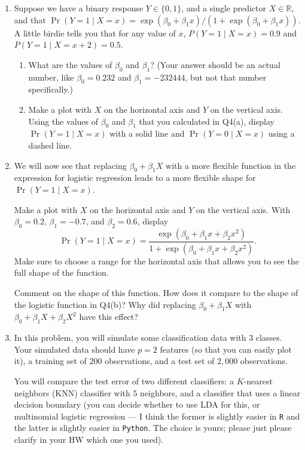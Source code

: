 \documentclass[12pt]{article}
\begin{document}
\begin{enumerate}
 
 \item Suppose we have a binary response $Y \in \{0,1\}$, and a single predictor $X \in \mathbb{R}$, and that  $\Pr(Y=1 \mid X=x) = {\exp(\beta_0 + \beta_1 x)}/{\left( 1+\exp(\beta_0 + \beta_1 x) \right)}$. A little birdie tells you that for any value of $x$, $P(Y=1 \mid X=x)=0.9$ and  $P(Y=1 \mid X=x+2)=0.5$.
 \begin{enumerate}
 \item What are the values of $\beta_0$ and $\beta_1$? (Your answer should be an actual number, like $\beta_0 = 0.232$ and $\beta_1=-232444$, but not that number specifically.)
 \item Make a plot  with $X$ on the horizontal axis and $Y$ on the vertical axis.  Using the values of $\beta_0$ and $\beta_1$ that you calculated in Q4(a), display $\Pr(Y=1 \mid X=x)$ with a solid line and $\Pr(Y=0 \mid X=x)$ using a dashed line.  %
 \end{enumerate}
 \item We will now see that replacing $\beta_0 + \beta_1 X$ with a more flexible function in the expression for logistic regression leads to a more flexible shape for $\Pr(Y=1 \mid X=x)$. 
 
 Make a plot with $X$ on the horizontal axis and $Y$ on the vertical axis. With $\beta_0=0.2$, $\beta_1=-0.7$, and $\beta_2=0.6$, display  $$\Pr(Y=1 \mid X=x) = \frac{\exp(\beta_0 + \beta_1 x + \beta_2 x^2)}{ 1+\exp(\beta_0 + \beta_1 x + \beta_2 x^2) }.$$ Make sure to choose a range for the horizontal axis that allows you to see the full shape of the function.
 
 Comment on the shape of this function. How does it compare to the shape of the logistic function in Q4(b)? Why did replacing $\beta_0 + \beta_1 X$ with $\beta_0 + \beta_1 X + \beta_2 X^2$  have this effect? 


 \item In this problem, you will simulate some classification data with $3$ classes. Your simulated data should have $p=2$ features (so that you can easily plot it), a training set of $200$ observations, and a test set of $2,000$ observations.

 You will compare the test error of two different classifiers: a $K$-nearest neighbors (KNN) classifier with $5$ neighbors, and a  classifier that uses a linear decision boundary (you can decide whether to use LDA for this, or multinomial logistic regression --- I think the former is slightly easier in \verb=R= and the latter is slightly easier in \verb=Python=. The choice is yours; please just please clarify in your HW which one you used).  


\end{enumerate}
\end{document}
